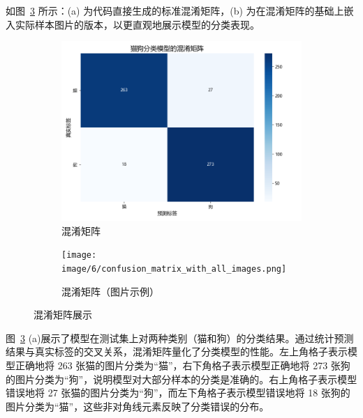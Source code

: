 如图~\ref{混淆矩阵展示} 所示：(a) 为代码直接生成的标准混淆矩阵，(b) 为在混淆矩阵的基础上嵌入实际样本图片的版本，以更直观地展示模型的分类表现。
\begin{figure}[ht]
    \centering
    \begin{subfigure}[b]{0.48\linewidth}  %
      \centering
      \includegraphics[width=\linewidth]{image/6/confusion_matrix.png}
      \caption{混淆矩阵}
      \label{混淆矩阵}
    \end{subfigure}
    \hspace{0.01\linewidth}  %
    \begin{subfigure}[b]{0.48\linewidth}  %
        \centering
        \texttt{[image: image/6/confusion\_matrix\_with\_all\_images.png]}
        \caption{混淆矩阵（图片示例）}
        \label{混淆矩阵（图片示例）}
    \end{subfigure}
    \captionsetup{font=small}  %
    \caption{混淆矩阵展示}
    \label{混淆矩阵展示}
\end{figure}

图~\ref{混淆矩阵展示} (a)展示了模型在测试集上对两种类别（猫和狗）的分类结果。通过统计预测结果与真实标签的交叉关系，混淆矩阵量化了分类模型的性能。左上角格子表示模型正确地将 263 张猫的图片分类为“猫”，右下角格子表示模型正确地将 273 张狗的图片分类为“狗”，说明模型对大部分样本的分类是准确的。右上角格子表示模型错误地将 27 张猫的图片分类为“狗”，而左下角格子表示模型错误地将 18 张狗的图片分类为“猫”，这些非对角线元素反映了分类错误的分布。

